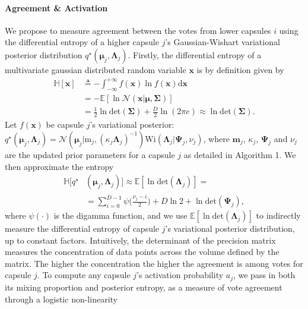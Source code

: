 \documentclass[letterpaper]{article} \usepackage{aaai20}  \usepackage{times}  \usepackage{helvet} \usepackage{courier}  \usepackage[hyphens]{url}  \usepackage{graphicx} \urlstyle{rm} \def\UrlFont{\rm}  \usepackage{graphicx}  \frenchspacing  \setlength{\pdfpagewidth}{8.5in}  \setlength{\pdfpageheight}{11in}  \nocopyright
\begin{document}
\paragraph{Agreement \& Activation}
We propose to measure agreement between the votes from lower capsules $i$ using the differential entropy of a higher capsule $j$'s Gaussian-Wishart variational posterior distribution $q^{\star}(\boldsymbol{\mu}_j, \boldsymbol{\Lambda}_j)$. Firstly, the differential entropy of a multivariate gaussian distributed random variable $\mathbf{x}$ is by definition given by
\begin{equation}
\begin{aligned}
    \mathbb{H}[\mathbf{x}] & \triangleq - \int_{-\infty}^{+\infty}f(\mathbf{x})\ln f(\mathbf{x}) \mathrm{d}\mathbf{x} \\ & = -\mathbb{E}[\ln \mathcal{ N}(\mathbf{x}|\boldsymbol{\mu}, \boldsymbol{\Sigma})] \\ 
    &= \frac{1}{2}\ln \mathrm{det}(\boldsymbol{\Sigma}) + \frac{D}{2}\ln(2\pi e) \approx \ln \mathrm{det}(\boldsymbol{\Sigma}).
\end{aligned}
\end{equation}
Let $f(\mathbf{x})$ be capsule $j$'s variational posterior: $q^{\star}(\boldsymbol{\mu}_j, \boldsymbol{\Lambda}_j) = \mathcal{N}(\boldsymbol{\mu}_j|\boldsymbol{\mathrm{m}}_j, (\kappa_j \boldsymbol{\Lambda}_j)^{-1})\mathrm{Wi}(\boldsymbol{\Lambda}_j|\boldsymbol{\Psi}_{j},\nu_{j})$, where $\mathbf{m}_j$, $\kappa_j$, $\boldsymbol{\Psi}_j$ and $\nu_j$ are the updated prior parameters for a capsule $j$ as detailed in Algorithm 1. We then approximate the entropy
\begin{equation}
\begin{aligned}
     \mathbb{H}[q^{\star}&(\boldsymbol{\mu}_j, \boldsymbol{\Lambda}_j)] \approx \mathbb{E}[\ln \mathrm{det}(\boldsymbol{\Lambda}_j)] = \\ &= \sum_{i=0}^{D-1}\psi \bigg(\frac{\nu_j - i}{2}\bigg) + D\ln 2 + \ln \mathrm{det}(\boldsymbol{\Psi}_j),
\end{aligned}
\end{equation}
where $\psi(\cdot)$ is the digamma function, and we use $\mathbb{E}[\ln \mathrm{det}(\boldsymbol{\Lambda}_j)]$ to indirectly measure the differential entropy of capsule $j$'s variational posterior distribution, up to constant factors. Intuitively, the determinant of the precision matrix measures the concentration of data points across the volume defined by the matrix. The higher the concentration the higher the agreement is among votes for capsule $j$. To compute any capsule $j$'s activation probability $a_j$, we pass in both its mixing proportion and posterior entropy, as a measure of vote agreement through a logistic non-linearity
\end{document}
